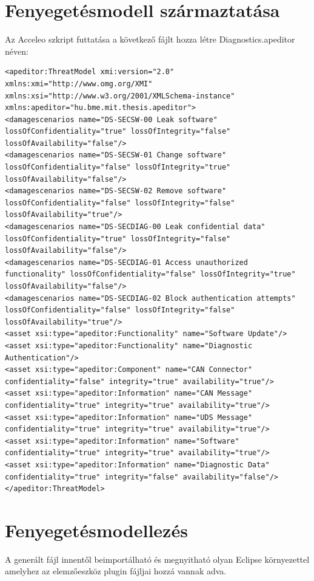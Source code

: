 \section{Fenyegetésmodell származtatása}

Az Acceleo szkript futtatása a következő fájlt hozza létre Diagnostics.apeditor néven:

\begin{lstlisting}[basicstyle=\tiny]
<apeditor:ThreatModel xmi:version="2.0" xmlns:xmi="http://www.omg.org/XMI" xmlns:xsi="http://www.w3.org/2001/XMLSchema-instance" xmlns:apeditor="hu.bme.mit.thesis.apeditor">
<damagescenarios name="DS-SECSW-00 Leak software" lossOfConfidentiality="true" lossOfIntegrity="false" lossOfAvailability="false"/>
<damagescenarios name="DS-SECSW-01 Change software" lossOfConfidentiality="false" lossOfIntegrity="true" lossOfAvailability="false"/>
<damagescenarios name="DS-SECSW-02 Remove software" lossOfConfidentiality="false" lossOfIntegrity="false" lossOfAvailability="true"/>
<damagescenarios name="DS-SECDIAG-00 Leak confidential data" lossOfConfidentiality="true" lossOfIntegrity="false" lossOfAvailability="false"/>
<damagescenarios name="DS-SECDIAG-01 Access unauthorized functionality" lossOfConfidentiality="false" lossOfIntegrity="true" lossOfAvailability="false"/>
<damagescenarios name="DS-SECDIAG-02 Block authentication attempts" lossOfConfidentiality="false" lossOfIntegrity="false" lossOfAvailability="true"/>
<asset xsi:type="apeditor:Functionality" name="Software Update"/>
<asset xsi:type="apeditor:Functionality" name="Diagnostic Authentication"/>
<asset xsi:type="apeditor:Component" name="CAN Connector" confidentiality="false" integrity="true" availability="true"/>
<asset xsi:type="apeditor:Information" name="CAN Message" confidentiality="true" integrity="true" availability="true"/>
<asset xsi:type="apeditor:Information" name="UDS Message" confidentiality="true" integrity="true" availability="true"/>
<asset xsi:type="apeditor:Information" name="Software" confidentiality="true" integrity="true" availability="true"/>
<asset xsi:type="apeditor:Information" name="Diagnostic Data" confidentiality="true" integrity="false" availability="false"/>
</apeditor:ThreatModel>
\end{lstlisting}

\section{Fenyegetésmodellezés}

A generált fájl innentől beimportálható és megnyitható olyan Eclipse környezettel amelyhez az elemzőeszköz plugin fájljai hozzá vannak adva.


